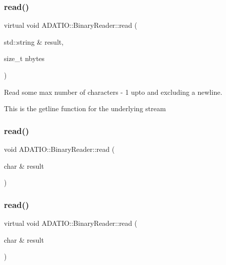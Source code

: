 \subsubsection{\texorpdfstring{read()}{read()}\hspace{0.1cm}{\footnotesize\ttfamily [2/22]}}
{\footnotesize\ttfamily virtual void A\+D\+A\+T\+I\+O\+::\+Binary\+Reader\+::read (\begin{DoxyParamCaption}\item[{std\+::string \&}]{result,  }\item[{size\+\_\+t}]{nbytes }\end{DoxyParamCaption})\hspace{0.3cm}{\ttfamily [virtual]}}



Read some max number of characters -\/ 1 upto and excluding a newline. 

This is the getline function for the underlying stream \mbox{\label{classADATIO_1_1BinaryReader_ae570afc4063058ada2653bbe7b7d7998}} 
\subsubsection{\texorpdfstring{read()}{read()}\hspace{0.1cm}{\footnotesize\ttfamily [3/22]}}
{\footnotesize\ttfamily void A\+D\+A\+T\+I\+O\+::\+Binary\+Reader\+::read (\begin{DoxyParamCaption}\item[{char \&}]{result }\end{DoxyParamCaption})\hspace{0.3cm}{\ttfamily [virtual]}}

\mbox{\label{classADATIO_1_1BinaryReader_a04c653824b3819b4b02ea5eed6fd57f5}} 
\subsubsection{\texorpdfstring{read()}{read()}\hspace{0.1cm}{\footnotesize\ttfamily [4/22]}}
{\footnotesize\ttfamily virtual void A\+D\+A\+T\+I\+O\+::\+Binary\+Reader\+::read (\begin{DoxyParamCaption}\item[{char \&}]{result }\end{DoxyParamCaption})\hspace{0.3cm}{\ttfamily [virtual]}}


